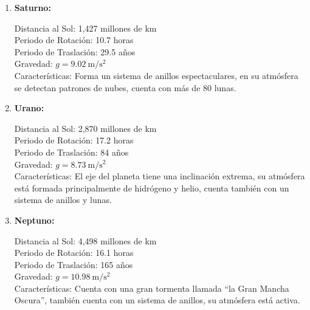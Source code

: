 \documentclass[14pt]{extarticle}
\begin{document}
\begin{enumerate}
\item \textbf{Saturno:}

Distancia al Sol: 1,427 millones de \unit{\kilo\meter} \\
Periodo de Rotación: 10.7 horas \\
Periodo de Traslación: 29.5 años \\
Gravedad: $g = \SI{9.02}{\meter\per\square\second}$ \\
Características: Forma un sistema de anillos espectaculares, en su atmósfera se detectan patrones de nubes, cuenta con más de 80 lunas.

\item \textbf{Urano:}

Distancia al Sol: 2,870 millones de \unit{\kilo\meter} \\
Periodo de Rotación: 17.2 horas \\
Periodo de Traslación: 84 años \\
Gravedad: $g = \SI{8.73}{\meter\per\square\second}$ \\
Características: El eje del planeta tiene una inclinación extrema, su atmósfera está formada principalmente de hidrógeno y helio, cuenta también con un sistema de anillos y lunas.

\item \textbf{Neptuno:}

Distancia al Sol: 4,498 millones de \unit{\kilo\meter} \\
Periodo de Rotación: 16.1 horas \\
Periodo de Traslación: 165 años \\
Gravedad: $g = \SI{10.98}{\meter\per\square\second}$ \\
Características: Cuenta con una gran tormenta llamada \enquote{la Gran Mancha Oscura}, también cuenta con un sistema de anillos, su atmósfera está activa.
\end{enumerate}
\end{document}
